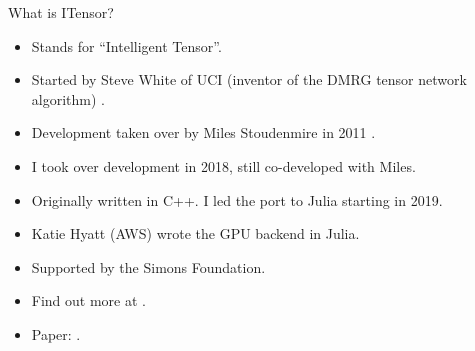 \begin{frame}{What is ITensor?}

\begin{itemize}[<+->]

  \item Stands for ``Intelligent Tensor''.
  \item Started by Steve White of UCI (inventor of the DMRG tensor network algorithm) .
  \item Development taken over by Miles Stoudenmire in 2011 .
  \item I took over development in 2018, still co-developed with Miles.
  \item Originally written in C++. I led the port to Julia starting in 2019.
  \item Katie Hyatt (AWS) wrote the GPU backend in Julia.
  \item Supported by the Simons Foundation.
  \item Find out more at .
  \item Paper: .

\end{itemize}

\end{frame}
